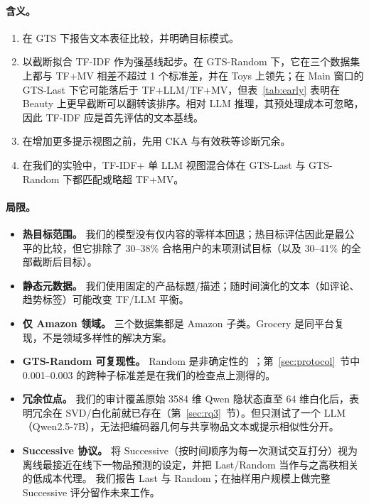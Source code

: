 \documentclass[sigconf,natbib=true,anonymous]{acmart}
\newcommand{\tfidf}{\textsc{TF-IDF}\xspace}
\newcommand{\tfllm}{\textsc{TF+LLM}\xspace}
\newcommand{\tfmv}{\textsc{TF+MV}\xspace}
\begin{document}
\paragraph{含义。}
\begin{enumerate}[leftmargin=*,itemsep=2pt]
\item 在 GTS 下报告文本表征比较，并明确目标模式。
\item 以截断拟合 \tfidf 作为强基线起步。在 GTS-Random 下，它在三个数据集上都与 \tfmv 相差不超过 1 个标准差，并在 Toys 上领先；在 Main 窗口的 GTS-Last 下它可能落后于 \tfllm/\tfmv，但表~\ref{tab:early} 表明在 Beauty 上更早截断可以翻转该排序。相对 LLM 推理，其预处理成本可忽略，因此 TF-IDF 应是首先评估的文本基线。
\item 在增加更多提示视图之前，先用 CKA 与有效秩等诊断冗余。
\item 在我们的实验中，\tfidf + 单 LLM 视图混合体在 GTS-Last 与 GTS-Random 下都匹配或略超 \tfmv。
\end{enumerate}

\paragraph{局限。}
\begin{itemize}[leftmargin=*,itemsep=1pt]
\item \textbf{热目标范围。}
我们的模型没有仅内容的零样本回退；热目标评估因此是最公平的比较，但它排除了 30--38\% 合格用户的末项测试目标（以及 30--41\% 的全部截断后目标）。
\item \textbf{静态元数据。}
我们使用固定的产品标题/描述；随时间演化的文本（如评论、趋势标签）可能改变 TF/LLM 平衡。
\item \textbf{仅 Amazon 领域。}
三个数据集都是 Amazon 子类。Grocery 是同平台复现，不是领域多样性的解决方案。
\item \textbf{GTS-Random 可复现性。}
Random 是非确定性的~\cite{gusak2025time}；第~\ref{sec:protocol}~节中 0.001--0.003 的跨种子标准差是在我们的检查点上测得的。
\item \textbf{冗余位点。}
我们的审计覆盖原始 3584 维 Qwen 隐状态直至 64 维白化后，表明冗余在 SVD/白化前就已存在（第~\ref{sec:rq3}~节）。但只测试了一个 LLM（Qwen2.5-7B），无法把编码器几何与共享物品文本或提示相似性分开。
\item \textbf{Successive 协议。}
\citet{gusak2025time} 将 Successive（按时间顺序为每一次测试交互打分）视为离线最接近在线下一物品预测的设定，并把 Last/Random 当作与之高秩相关的低成本代理。
我们报告 Last 与 Random；在抽样用户规模上做完整 Successive 评分留作未来工作。
\end{itemize}
\end{document}
